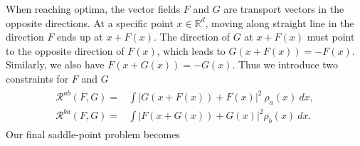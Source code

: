 \documentclass{article}
\begin{document}
When reaching optima, the vector fields $F$ and $G$ are transport vectors in the opposite directions. At a specific point $x\in\mathbb{R}^d$, moving along straight line in the direction ${F}$ ends up at $x+{F}(x)$. The direction of ${G}$ at $x+{F}(x)$ must point to the opposite direction of ${F}(x)$, which leads to ${G}(x+{F}(x))=-{F}(x)$. Similarly, we also have ${F}(x+{G}(x))=-{G}(x)$. Thus we introduce two constraints for ${F}$ and ${G}$
\begin{align*}
\begin{split}
 \mathcal{R}^{ab}({F}, {G}) = & \int |{G}(x+{F}(x))+{F}(x)|^2~\rho_a(x)~dx, \\
 \mathcal{R}^{ba}({F}, {G}) = & \int |{F}(x+{G}(x))+{G}(x)|^2\rho_b(x)~dx.
\end{split}
\end{align*}
Our final saddle-point problem becomes
\end{document}

